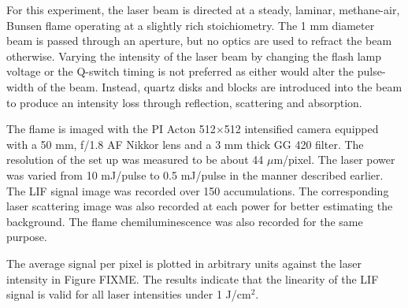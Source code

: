 For this experiment, the laser beam is directed at a steady, laminar, methane-air, Bunsen flame operating at a slightly rich stoichiometry.
The 1 mm diameter beam is passed through an aperture, but no optics are used to refract the beam otherwise.
Varying the intensity of the laser beam by changing the flash lamp voltage or the Q-switch timing is not preferred as either would alter the pulse-width of the beam.
Instead, quartz disks and blocks are introduced into the beam to produce an intensity loss through reflection, scattering and absorption.

The flame is imaged with the PI Acton 512\(\times\)512 intensified camera equipped with a 50 mm, f/1.8 AF Nikkor lens and a 3 mm thick GG 420 filter.
The resolution of the set up was measured to be about 44 \(\mu\)m/pixel.
The laser power was varied from 10 mJ/pulse to 0.5 mJ/pulse in the manner described earlier.
The LIF signal image was recorded over 150 accumulations.
The corresponding laser scattering image was also recorded at each power for better estimating the background.
The flame chemiluminescence was also recorded for the same purpose.

The average signal per pixel is plotted in arbitrary units against the laser intensity in Figure FIXME.
The results indicate that the linearity of the LIF signal is valid for all laser intensities under 1 J/cm\(^2\).

